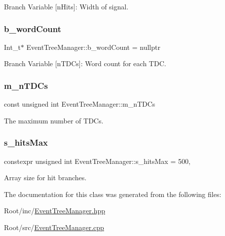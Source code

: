 Branch Variable \mbox{[}n\+Hits\mbox{]}\+: Width of signal. 

\mbox{\label{class_event_tree_manager_a620baae5d4f40b73d5b374d9aa21c02e}} 
\subsubsection{\texorpdfstring{b\+\_\+word\+Count}{b\_wordCount}}
{\footnotesize\ttfamily Int\+\_\+t$\ast$ Event\+Tree\+Manager\+::b\+\_\+word\+Count = nullptr\hspace{0.3cm}{\ttfamily [private]}}



Branch Variable \mbox{[}n\+T\+D\+Cs\mbox{]}\+: Word count for each T\+DC. 

\mbox{\label{class_event_tree_manager_a87c672aa1531b362b15eddf11cab00c8}} 
\subsubsection{\texorpdfstring{m\+\_\+n\+T\+D\+Cs}{m\_nTDCs}}
{\footnotesize\ttfamily const unsigned int Event\+Tree\+Manager\+::m\+\_\+n\+T\+D\+Cs\hspace{0.3cm}{\ttfamily [private]}}



The maximum number of T\+D\+Cs. 

\mbox{\label{class_event_tree_manager_aab35ad52374d52149bde894c8af7a8c5}} 
\subsubsection{\texorpdfstring{s\+\_\+hits\+Max}{s\_hitsMax}}
{\footnotesize\ttfamily constexpr unsigned int Event\+Tree\+Manager\+::s\+\_\+hits\+Max = 500\hspace{0.3cm}{\ttfamily [static]}, {\ttfamily [private]}}



Array size for hit branches. 



The documentation for this class was generated from the following files\+:\begin{DoxyCompactItemize}
\item 
Root/inc/\hyperlink{_event_tree_manager_8hpp}{Event\+Tree\+Manager.\+hpp}\item 
Root/src/\hyperlink{_event_tree_manager_8cpp}{Event\+Tree\+Manager.\+cpp}\end{DoxyCompactItemize}

